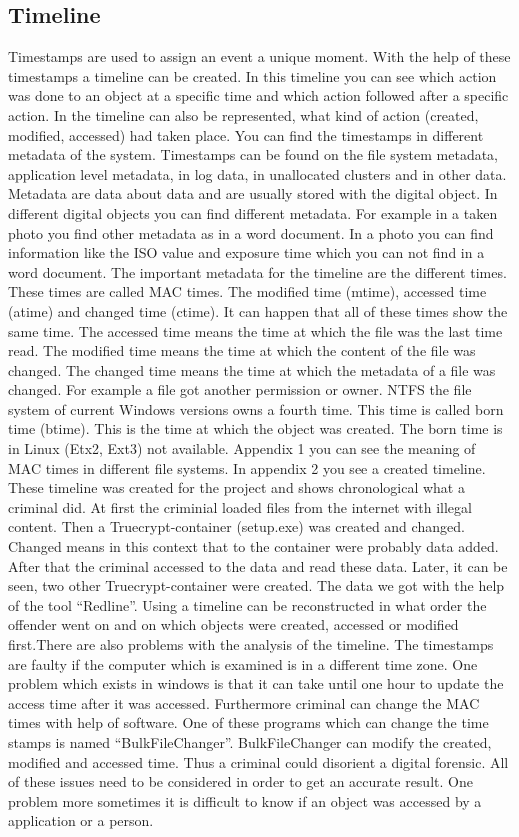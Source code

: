 \subsection{Timeline}
Timestamps are used to assign an event a unique moment. With the help of these timestamps a timeline can be created. In this timeline you can see which action was done to an object at a specific time and which action followed after a specific action. In the timeline can also be represented, what kind of action (created, modified, accessed) had taken place. You can find the timestamps in different metadata of the system. Timestamps can be found on the file system metadata, application level metadata, in log data, in unallocated clusters and in other data. Metadata are data about data and are usually stored with the digital object. In different digital objects you can find different metadata. For example in a taken photo you find other metadata as in a word document. In a photo you can find information like the ISO value and exposure time which you can not find in a word document. The important metadata for the timeline are the different times. These times are called MAC times. The modified time (mtime), accessed time (atime) and changed time (ctime). It can happen that all of these times show the same time. The accessed time means the time at which the file was the last time read. The modified time means the time at which the content of the file was changed. The changed time means the time at which the metadata of a file was changed. For example a file got another permission or owner. NTFS the file system of current Windows versions owns a fourth time. This time is called born time (btime). This is the time at which the object was created. The born time is in Linux (Etx2, Ext3) not available. Appendix 1 you can see the meaning of MAC times in different file systems. In appendix 2 you see a created timeline. These timeline was created for the project and shows chronological what a criminal did. At first the criminial loaded files from the internet with illegal content. Then a Truecrypt-container (setup.exe) was created and changed. Changed means in this context that to the container were probably data added. After that the criminal accessed to the data and read these data. Later, it can be seen, two other Truecrypt-container were created. The data we got with the help of the tool “Redline”. Using a timeline can be reconstructed in what order the offender went on and on which objects were created, accessed or modified first.\newline \newline There are also problems with the analysis of the timeline. The timestamps are faulty if the computer which is examined is in a different time zone. One problem which exists in windows is that it can take until one hour to update the access time after it was accessed. Furthermore criminal can change the MAC times with help of software. One of these programs which can change the time stamps is named “BulkFileChanger”. BulkFileChanger can modify the created, modified and accessed time. Thus a criminal could disorient a digital forensic. All of these issues need to be considered in order to get an accurate result. One problem more sometimes it is difficult to know if an object was accessed by a application or a person. 
